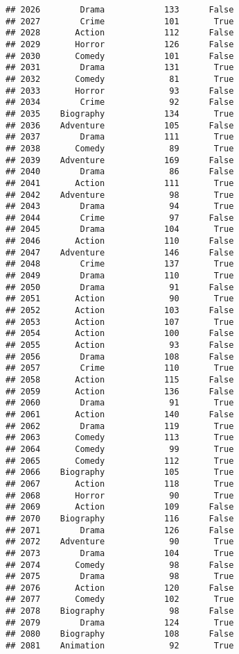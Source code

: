 \documentclass[
]{article}
\begin{document}
\begin{verbatim}
## 2026        Drama            133      False
## 2027        Crime            101       True
## 2028       Action            112      False
## 2029       Horror            126      False
## 2030       Comedy            101      False
## 2031        Drama            131       True
## 2032       Comedy             81       True
## 2033       Horror             93      False
## 2034        Crime             92      False
## 2035    Biography            134       True
## 2036    Adventure            105      False
## 2037        Drama            111       True
## 2038       Comedy             89       True
## 2039    Adventure            169      False
## 2040        Drama             86      False
## 2041       Action            111       True
## 2042    Adventure             98       True
## 2043        Drama             94       True
## 2044        Crime             97      False
## 2045        Drama            104       True
## 2046       Action            110      False
## 2047    Adventure            146      False
## 2048        Crime            137       True
## 2049        Drama            110       True
## 2050        Drama             91      False
## 2051       Action             90       True
## 2052       Action            103      False
## 2053       Action            107       True
## 2054       Action            100      False
## 2055       Action             93      False
## 2056        Drama            108      False
## 2057        Crime            110       True
## 2058       Action            115      False
## 2059       Action            136      False
## 2060        Drama             91       True
## 2061       Action            140      False
## 2062        Drama            119       True
## 2063       Comedy            113       True
## 2064       Comedy             99       True
## 2065       Comedy            112       True
## 2066    Biography            105       True
## 2067       Action            118       True
## 2068       Horror             90       True
## 2069       Action            109      False
## 2070    Biography            116      False
## 2071        Drama            126      False
## 2072    Adventure             90       True
## 2073        Drama            104       True
## 2074       Comedy             98      False
## 2075        Drama             98       True
## 2076       Action            120      False
## 2077       Comedy            102       True
## 2078    Biography             98      False
## 2079        Drama            124       True
## 2080    Biography            108      False
## 2081    Animation             92       True

\end{verbatim}
\end{document}
